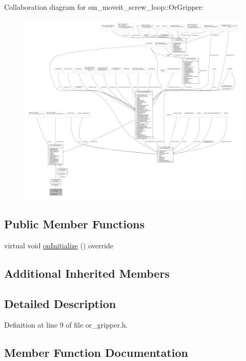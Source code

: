 Collaboration diagram for sm\+\_\+moveit\+\_\+screw\+\_\+loop\+:\+:Or\+Gripper\+:
\nopagebreak
\begin{figure}[H]
\begin{center}
\leavevmode
\includegraphics[width=350pt]{classsm__moveit__screw__loop_1_1OrGripper__coll__graph}
\end{center}
\end{figure}
\subsection*{Public Member Functions}
\begin{DoxyCompactItemize}
\item 
virtual void \hyperlink{classsm__moveit__screw__loop_1_1OrGripper_a0c008d218926a5270c565955880f7092}{on\+Initialize} () override
\end{DoxyCompactItemize}
\subsection*{Additional Inherited Members}


\subsection{Detailed Description}


Definition at line 9 of file or\+\_\+gripper.\+h.



\subsection{Member Function Documentation}
\mbox{\label{classsm__moveit__screw__loop_1_1OrGripper_a0c008d218926a5270c565955880f7092}} 
